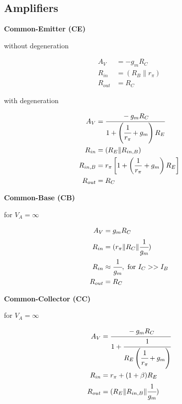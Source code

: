 \documentclass{article}
\begin{document}
\subsection*{Amplifiers}
\noindent
\begin{minipage}[b][6cm][t]{0.58\linewidth}
\begin{center}
\bf Common-Emitter (CE)
\end{center}

\begin{minipage}[b][5cm][t]{0.5\linewidth}
    \begin{center}
        without degeneration
    \end{center}
    \begin{align*}
        A_V&=-g_mR_C\\
        R_{in}&=(R_B\|r_\pi)\\
        R_{out}&=R_C
    \end{align*}
    \vfill
\end{minipage}
\begin{minipage}[b][5cm][t]{0.5\linewidth}
    \begin{center}
        with degeneration
    \end{center}
    \begin{align*}
        A_V&=\cfrac{-g_mR_C }{1+\left(\cfrac{1}{r_\pi}+g_m\right)R_E}\\
        R_{in}&=(R_E\|R_{in,B})\\
        R_{in,B}&=r_\pi\left[1+\left(\frac{1}{r_\pi}+g_m\right)R_E\right]\\
        R_{out}&=R_C
    \end{align*}
\end{minipage}
\end{minipage}
\hfill
\begin{minipage}[b][6cm][t]{0.38\linewidth}
\begin{center}
{\bf Common-Base (CB)}

for $V_A=\infty$
\end{center}
\begin{align*}
        A_V&=g_mR_C\\
        R_{in}&=(r_\pi\|R_C\|\cfrac{1}{g_m})\\
        R_{in}&\approx\cfrac{1}{g_m},\,\,\mbox{for } I_C>>I_B\\
        R_{out}&=R_C
    \end{align*}
\end{minipage}
\begin{minipage}[b][3cm][t]{0.3\linewidth}
\begin{center}
{\bf Common-Collector (CC)}

for $V_A=\infty$
\end{center}
\begin{align*}
        A_V&=\cfrac{-g_mR_C }{1+\cfrac{1}{R_E\left(\cfrac{1}{r_\pi}+g_m\right)}}\\
        R_{in}&=r_{\pi}+(1+\beta)R_E\\
        R_{out}&=(R_E\|R_{in,B}\|\cfrac{1}{g_m})
    \end{align*}
\end{minipage}
\end{document}
